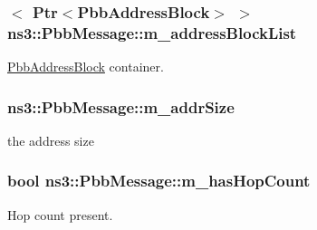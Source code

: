\subsubsection[{\texorpdfstring{m\+\_\+address\+Block\+List}{m_addressBlockList}}]{$<$ {\bf Ptr}$<${\bf Pbb\+Address\+Block}$>$ $>$ ns3\+::\+Pbb\+Message\+::m\+\_\+address\+Block\+List\hspace{0.3cm}{\ttfamily [private]}}\hypertarget{classns3_1_1PbbMessage_a03b5fb172d93f0e6b4997148bd703ff1}{}\label{classns3_1_1PbbMessage_a03b5fb172d93f0e6b4997148bd703ff1}


\hyperlink{classns3_1_1PbbAddressBlock}{Pbb\+Address\+Block} container. 

\subsubsection[{\texorpdfstring{m\+\_\+addr\+Size}{m_addrSize}}]{ ns3\+::\+Pbb\+Message\+::m\+\_\+addr\+Size\hspace{0.3cm}{\ttfamily [private]}}\hypertarget{classns3_1_1PbbMessage_ad2248d17e3198d4232dbe1043e045a53}{}\label{classns3_1_1PbbMessage_ad2248d17e3198d4232dbe1043e045a53}


the address size 

\subsubsection[{\texorpdfstring{m\+\_\+has\+Hop\+Count}{m_hasHopCount}}]{\setlength{\rightskip}{0pt plus 5cm}bool ns3\+::\+Pbb\+Message\+::m\+\_\+has\+Hop\+Count\hspace{0.3cm}{\ttfamily [private]}}\hypertarget{classns3_1_1PbbMessage_a96849a9a82f3ace89fd1267a259bb476}{}\label{classns3_1_1PbbMessage_a96849a9a82f3ace89fd1267a259bb476}


Hop count present. 

